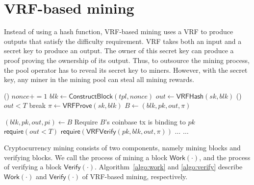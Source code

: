\section{VRF-based mining}
\label{sec:construction}

Instead of using a hash function, VRF-based mining uses a VRF to produce outputs that satisfy the difficulty requirement.
VRF takes both an input and a secret key to produce an output.
The owner of this secret key can produce a proof proving the ownership of its output.
Thus, to outsource the mining process, the pool operator has to reveal its secret key to miners.
However, with the secret key, any miner in the mining pool can steal all mining rewards.

\begin{algorithm}[]
\caption{$\mathsf{Work}(sk, pk, tpl, T)$.}\label{algo:work}
\SetAlgoLined\DontPrintSemicolon
  \While () {$nonce += 1$}{
    $blk \gets \mathsf{ConstructBlock}(tpl, nonce)$ 
    $out \gets \mathsf{VRFHash}(sk, blk)$ 
    \If () {$out < T$}{
      break 
    }
  }
  $\pi \gets \mathsf{VRFProve}(sk, blk)$ 
  $B \gets (blk, pk, out, \pi)$ 
\end{algorithm}



\begin{algorithm}[h]
\caption{$\mathsf{Verify}(B, T)$}\label{algo:verify}
\SetAlgoLined\DontPrintSemicolon
  $(blk, pk, out, pi) \gets B$ 
  Require $B$'s coinbase tx is binding to $pk$\\
  $\mathsf{require}(out < T)$ 
  $\mathsf{require}(\mathsf{VRFVerify}(pk, blk, out, \pi))$ \;
  $\dots$ 
  $\dots$ 
\end{algorithm}

Cryptocurrency mining consists of two components, namely mining blocks and verifying blocks.
We call the process of mining a block $\mathsf{Work}(\cdot)$, and the process of verifying a block $\mathsf{Verify}(\cdot)$.
Algorithm~\ref{algo:work} and \ref{algo:verify} describe $\mathsf{Work}(\cdot)$ and $\mathsf{Verify}(\cdot)$ of VRF-based mining, respectively.

